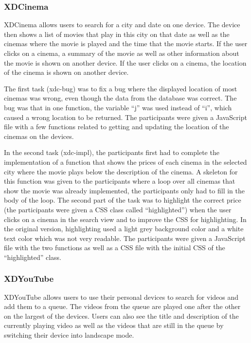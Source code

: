 \subsubsection{XDCinema}

XDCinema allows users to search for a city and date on one device. The device then shows a list of movies that play in this city on that date as well as the cinemas where the movie is played and the time that the movie starts. If the user clicks on a cinema, a summary of the movie as well as other information about the movie is shown on another device. If the user clicks on a cinema, the location of the cinema is shown on another device.

The first task (xdc-bug) was to fix a bug where the displayed location of most cinemas was wrong, even though the data from the database was correct. The bug was that in one function, the variable ``j'' was used instead of ``i'', which caused a wrong location to be returned. The participants were given a JavaScript file with a few functions related to getting and updating the location of the cinemas on the devices.

In the second task (xdc-impl), the participants first had to complete the implementation of a function that shows the prices of each cinema in the selected city where the movie plays below the description of the cinema. A skeleton for this function was given to the participants where a loop over all cinemas that show the movie was already implemented, the participants only had to fill in the body of the loop. The second part of the task was to highlight the correct price (the participants were given a CSS class called ``highlighted'') when the user clicks on a cinema in the search view and to improve the CSS for highlighting. In the original version, highlighting used a light grey background color and a white text color which was not very readable. The participants were given a JavaScript file with the two functions as well as a CSS file with the initial CSS of the ``highlighted'' class.

\subsubsection{XDYouTube}
XDYouTube allows users to use their personal devices to search for videos and add them to a queue. The videos from the queue are played one after the other on the largest of the devices. Users can also see the title and description of the currently playing video as well as the videos that are still in the queue by switching their device into landscape mode.

